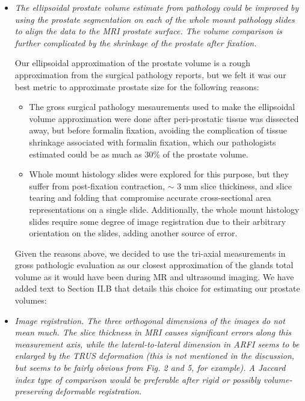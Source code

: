 \documentclass[10pt]{article}
\begin{document}
\begin{itemize}
    \item \textit{The ellipsoidal prostate volume estimate from pathology could be
        improved by using the prostate segmentation on each of the whole mount
        pathology slides to align the data to the MRI prostate surface. The
        volume comparison is further complicated by the shrinkage of the
        prostate after fixation.}

   Our ellipsoidal approximation of the prostate volume is a rough
   approximation from the surgical pathology reports, but we felt it was our
   best metric to approximate prostate size for the following reasons:

   \begin{itemize}
        \item The gross surgical pathology mesaurements used to make the
            ellipsoidal volume approximation were done after peri-prostatic
            tissue was dissected away, but before formalin fixation, avoiding
            the complication of tissue shrinkage associated with formalin
            fixation, which our pathologists estimated could be as much as 30\%
            of the prostate volume.
        \item Whole mount histology slides were explored for this purpose, but
            they suffer from post-fixation contraction, $\sim$ 3 mm slice
            thickiness, and slice tearing and folding that compromise accurate
            cross-sectional area representations on a single slide.
            Additionally, the whole mount histology slides require some degree
            of image registration due to their arbitrary orientation on the
            slides, adding another source of error.
    \end{itemize}

    Given the reasons above, we decided to use the tri-axial measurements in
    gross pathologic evaluation as our closest approximation of the glands
    total volume as it would have been during MR and ultrasound imaging.  We
    have added text to Section II.B that details this choice for estimating our
    prostate volumes:

    \textbf{}

    \item \textit{Image registration. The three orthogonal dimensions of the
            images do not mean much. The slice thickness in MRI causes
            significant errors along this measurement axis, while the
            lateral-to-lateral dimension in ARFI seems to be enlarged by the
            TRUS deformation (this is not mentioned in the discussion, but
            seems to be fairly obvious from Fig. 2 and 5, for example). A
            Jaccard index type of comparison would be preferable after rigid or
            possibly volume-preserving deformable registration.}


\end{itemize}
\end{document}
